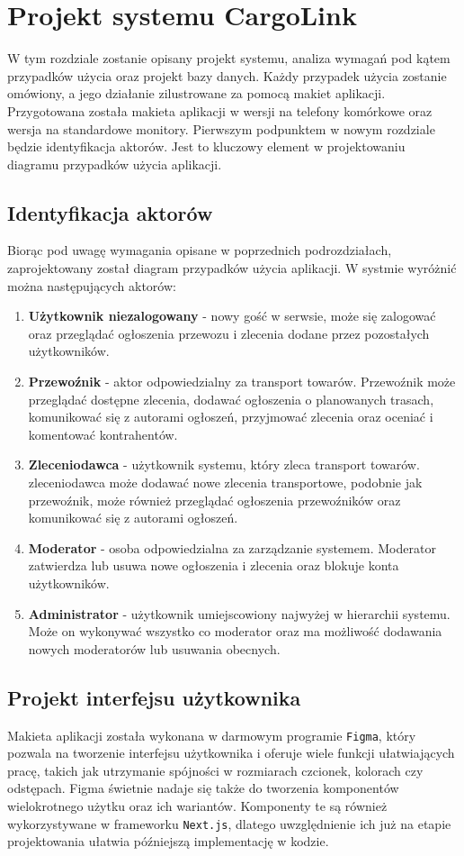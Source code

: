 \chapter{Projekt systemu CargoLink}
W tym rozdziale zostanie opisany projekt systemu, analiza wymagań pod kątem przypadków użycia oraz projekt bazy danych. Każdy przypadek użycia zostanie omówiony, a jego działanie zilustrowane za pomocą makiet aplikacji. Przygotowana została makieta aplikacji w wersji na telefony komórkowe oraz wersja na standardowe monitory. Pierwszym podpunktem w nowym rozdziale będzie identyfikacja aktorów. Jest to kluczowy element w projektowaniu diagramu przypadków użycia aplikacji.

\section{Identyfikacja aktorów}
Biorąc pod uwagę wymagania opisane w poprzednich podrozdziałach, zaprojektowany został diagram przypadków użycia aplikacji. W systmie wyróżnić można następujących aktorów:
\begin{enumerate}
\item \textbf{Użytkownik niezalogowany} - nowy gość w serwsie, może  się zalogować oraz przeglądać ogłoszenia przewozu i zlecenia dodane przez pozostałych użytkowników.
\item \textbf{Przewoźnik} - aktor odpowiedzialny za transport towarów. Przewoźnik może przeglądać dostępne zlecenia, dodawać ogłoszenia o planowanych trasach, komunikować się z autorami ogłoszeń, przyjmować zlecenia oraz oceniać i komentować kontrahentów.
\item \textbf{Zleceniodawca} - użytkownik systemu, który zleca transport towarów. zleceniodawca może dodawać nowe zlecenia transportowe, podobnie jak przewoźnik, może również przeglądać ogłoszenia przewoźników oraz komunikować się z autorami ogłoszeń.
\item \textbf{Moderator} - osoba odpowiedzialna za zarządzanie systemem. Moderator zatwierdza lub usuwa nowe ogłoszenia i zlecenia oraz blokuje konta użytkowników.
\item \textbf{Administrator} - użytkownik umiejscowiony najwyżej w hierarchii systemu. Może on wykonywać wszystko co moderator oraz ma możliwość dodawania nowych moderatorów lub usuwania obecnych.
\end{enumerate}

\section{Projekt interfejsu użytkownika}
Makieta aplikacji została wykonana w darmowym programie \texttt{Figma}, który pozwala na tworzenie interfejsu użytkownika i oferuje wiele funkcji ułatwiających pracę, takich jak utrzymanie spójności w rozmiarach czcionek, kolorach czy odstępach. Figma świetnie nadaje się także do tworzenia komponentów wielokrotnego użytku oraz ich wariantów. Komponenty te są również wykorzystywane w frameworku \texttt{Next.js}, dlatego uwzględnienie ich już na etapie projektowania ułatwia późniejszą implementację w kodzie.

